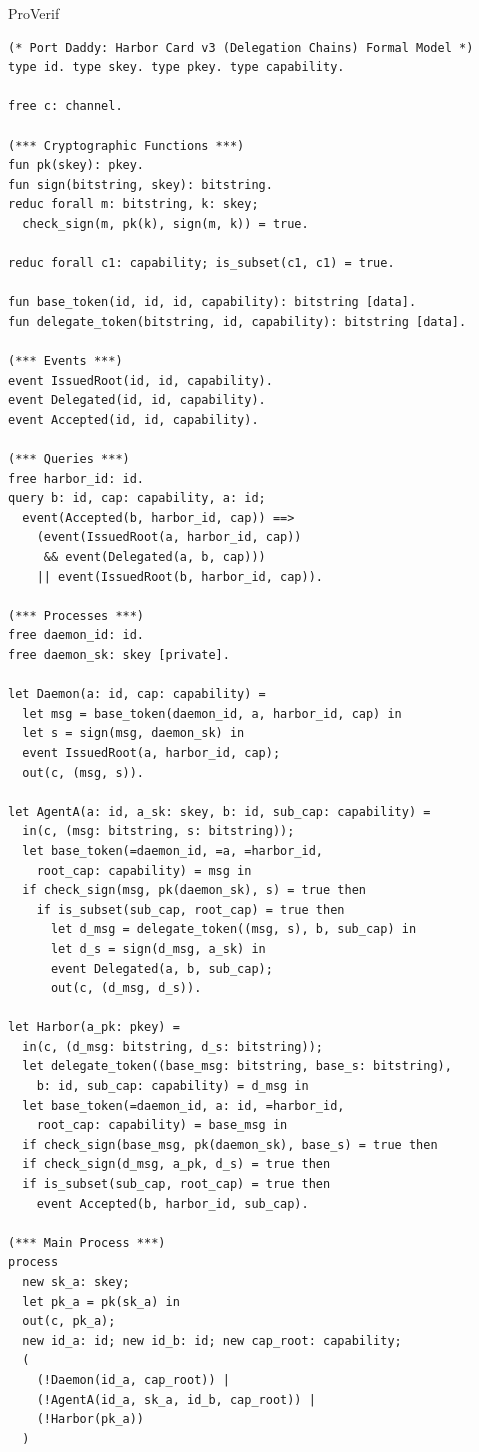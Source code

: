 \documentclass[11pt,a4paper]{article}
\theoremstyle{definition}
\begin{document}
\begin{pdlisting}{ProVerif}{}
\begin{lstlisting}[caption={\texttt{harbor\_card\_v3\_delegation.pv}, the reflexive-order model (see §\ref{sec:attn-soundness} for the soundness caveat and the enriched v5 proof)}]
(* Port Daddy: Harbor Card v3 (Delegation Chains) Formal Model *)
type id. type skey. type pkey. type capability.

free c: channel.

(*** Cryptographic Functions ***)
fun pk(skey): pkey.
fun sign(bitstring, skey): bitstring.
reduc forall m: bitstring, k: skey;
  check_sign(m, pk(k), sign(m, k)) = true.

reduc forall c1: capability; is_subset(c1, c1) = true.

fun base_token(id, id, id, capability): bitstring [data].
fun delegate_token(bitstring, id, capability): bitstring [data].

(*** Events ***)
event IssuedRoot(id, id, capability).
event Delegated(id, id, capability).
event Accepted(id, id, capability).

(*** Queries ***)
free harbor_id: id.
query b: id, cap: capability, a: id;
  event(Accepted(b, harbor_id, cap)) ==>
    (event(IssuedRoot(a, harbor_id, cap))
     && event(Delegated(a, b, cap)))
    || event(IssuedRoot(b, harbor_id, cap)).

(*** Processes ***)
free daemon_id: id.
free daemon_sk: skey [private].

let Daemon(a: id, cap: capability) =
  let msg = base_token(daemon_id, a, harbor_id, cap) in
  let s = sign(msg, daemon_sk) in
  event IssuedRoot(a, harbor_id, cap);
  out(c, (msg, s)).

let AgentA(a: id, a_sk: skey, b: id, sub_cap: capability) =
  in(c, (msg: bitstring, s: bitstring));
  let base_token(=daemon_id, =a, =harbor_id,
    root_cap: capability) = msg in
  if check_sign(msg, pk(daemon_sk), s) = true then
    if is_subset(sub_cap, root_cap) = true then
      let d_msg = delegate_token((msg, s), b, sub_cap) in
      let d_s = sign(d_msg, a_sk) in
      event Delegated(a, b, sub_cap);
      out(c, (d_msg, d_s)).

let Harbor(a_pk: pkey) =
  in(c, (d_msg: bitstring, d_s: bitstring));
  let delegate_token((base_msg: bitstring, base_s: bitstring),
    b: id, sub_cap: capability) = d_msg in
  let base_token(=daemon_id, a: id, =harbor_id,
    root_cap: capability) = base_msg in
  if check_sign(base_msg, pk(daemon_sk), base_s) = true then
  if check_sign(d_msg, a_pk, d_s) = true then
  if is_subset(sub_cap, root_cap) = true then
    event Accepted(b, harbor_id, sub_cap).

(*** Main Process ***)
process
  new sk_a: skey;
  let pk_a = pk(sk_a) in
  out(c, pk_a);
  new id_a: id; new id_b: id; new cap_root: capability;
  (
    (!Daemon(id_a, cap_root)) |
    (!AgentA(id_a, sk_a, id_b, cap_root)) |
    (!Harbor(pk_a))
  )
\end{lstlisting}
\end{pdlisting}
\end{document}
